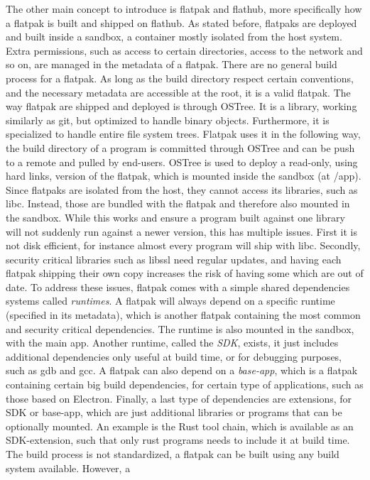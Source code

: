 \documentclass[a4paper,11pt,oneside]{report}
\theoremstyle{definition}
\newcommand{\fp}{flatpak\xspace}
\newcommand{\Fp}{Flatpak\xspace}
\newcommand{\fh}{flathub\xspace}
\newcommand{\ot}{OSTree\xspace}
\begin{document}
The other main concept to introduce is \fp and \fh, more specifically how a
\fp is built and shipped on \fh. As stated before, flatpaks are deployed and built
inside a sandbox, a container mostly isolated from the host system. Extra
permissions, such as access to certain directories, access to the network and so on, 
are managed in the metadata of a \fp. There are no general build process for a
\fp. As long as the build directory respect certain conventions, and the
necessary metadata are accessible at the root, it is a valid \fp. The way
\fp are shipped and deployed is through \ot. It is a library, working
similarly as git, but optimized to handle binary objects. Furthermore, it is
specialized to handle entire file system trees. \Fp uses it in the following
way, the build directory of a program is committed through \ot and can be
push to a remote and pulled by end-users. \ot is used to deploy a read-only,
using hard links, version of the \fp, which is mounted inside the sandbox (at
/app). Since flatpaks are isolated from the host, they cannot access its libraries,
such as libc. Instead, those are bundled with the \fp and therefore also mounted
in the sandbox. While this works and ensure a program built against one library
will not suddenly run against a newer version, this has multiple issues. First
it is not disk efficient, for instance almost every program will ship with
libc. Secondly, security critical libraries such as libssl need regular
updates, and having each \fp shipping their own copy increases the risk of
having some which are out of date. To address these issues, \fp comes with a
simple shared dependencies systems called \emph{runtimes}. A \fp will always depend on
a specific runtime (specified in its metadata), which is another \fp
containing the most common and security critical dependencies. The runtime is
also mounted in the sandbox, with the main app. Another runtime, called the
\emph{SDK}, exists, it just includes additional dependencies only useful at build
time, or for debugging purposes, such as gdb and gcc. A \fp can also depend on
a \emph{base-app}, which is a \fp containing certain big build dependencies, for
certain type of applications, such as those based on Electron. Finally, a last
type of dependencies are extensions, for SDK or base-app, which are just
additional libraries or programs that can be optionally mounted. An example is
the Rust tool chain, which is available as an SDK-extension, such that only rust
programs needs to include it at build time. 
The build process is not
standardized, a \fp can be built using any build system available. However, a
\end{document}
